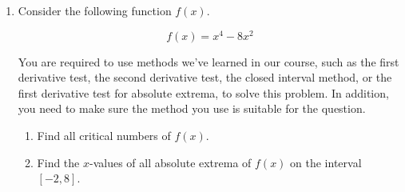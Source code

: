 \documentclass[11pt]{article}
\begin{document}
\begin{enumerate}
\newpage


\item Consider the following function $f(x)$.%

\[f(x)=x^{4}-8x^{2}\]%


You are required to use methods we've learned in our course, such as the first derivative test, the second derivative test, the closed interval method, or the first derivative test for absolute extrema, to solve this problem. In addition, you need to make sure the method you use is suitable for the question.

\begin{enumerate}
    \item Find all critical numbers of $f(x)$.

    \vfill



    \item Find the $x$-values of all absolute extrema of $f(x)$ on the interval $[-2, 8]$.


    \vfill
\end{enumerate}


\newpage



\end{enumerate}
\end{document}
